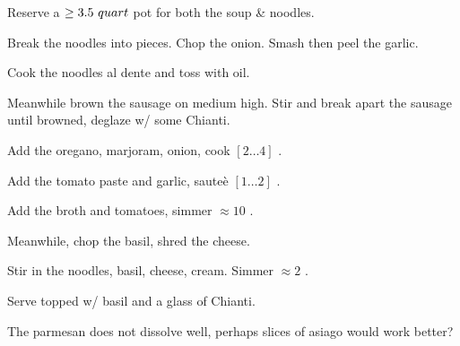 \begin{preparation}
\item Reserve a $\geq 3.5~quart$ pot for both the soup \& noodles.

\item Break the noodles into pieces.
	Chop the onion.
	Smash then peel the garlic.

\item Cook the noodles al dente and toss with oil.

\item Meanwhile brown the sausage on medium high.
	Stir and break apart the sausage until browned, deglaze w/ some Chianti.

\item Add the oregano, marjoram, onion, cook $[2 \ldots 4]$ \minute.

\item Add the tomato paste and garlic, saute\`{e} $[1 \ldots 2]$ \minute.

\item Add the broth and tomatoes, simmer $\approx 10$ \minute.

\item Meanwhile, chop the basil, shred the cheese.

\item Stir in the noodles, basil, cheese, cream.
	Simmer $\approx 2$ \minute.

\item Serve topped w/ basil and a glass of Chianti.
\end{preparation}


\begin{experiments}
\item The parmesan does not dissolve well, perhaps slices of asiago would work better?
\end{experiments}

\recipeend

